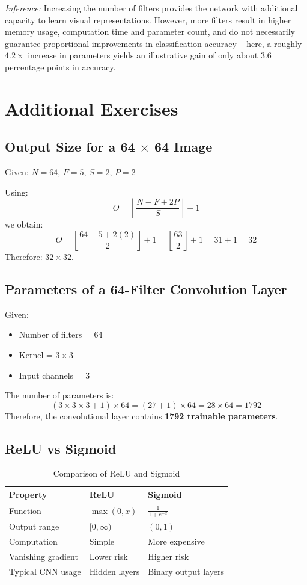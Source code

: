 \documentclass[11pt]{article}
\begin{document}
\textit{Inference:} Increasing the number of filters provides the network with additional capacity to learn visual representations. However, more filters result in higher memory usage, computation time and parameter count, and do not necessarily guarantee proportional improvements in classification accuracy -- here, a roughly $4.2\times$ increase in parameters yields an illustrative gain of only about 3.6 percentage points in accuracy.

\section{Additional Exercises}

\subsection{Output Size for a 64 $\times$ 64 Image}
Given: $N = 64$, $F = 5$, $S = 2$, $P = 2$

Using:
\[
O = \left\lfloor \frac{N - F + 2P}{S} \right\rfloor + 1
\]
we obtain:
\[
O = \left\lfloor \frac{64 - 5 + 2(2)}{2} \right\rfloor + 1 = \left\lfloor \frac{63}{2} \right\rfloor + 1 = 31 + 1 = 32
\]
Therefore: $32 \times 32$.

\subsection{Parameters of a 64-Filter Convolution Layer}
Given:
\begin{itemize}
    \item Number of filters = 64
    \item Kernel = $3 \times 3$
    \item Input channels = 3
\end{itemize}
The number of parameters is:
\[
(3 \times 3 \times 3 + 1) \times 64 = (27 + 1) \times 64 = 28 \times 64 = 1792
\]
Therefore, the convolutional layer contains \textbf{1792 trainable parameters}.

\subsection{ReLU vs Sigmoid}
\begin{table}[h]
\centering
\caption{Comparison of ReLU and Sigmoid}
\begin{tabular}{|l|l|l|}
\hline
\textbf{Property} & \textbf{ReLU} & \textbf{Sigmoid} \\
\hline
Function & $\max(0, x)$ & $\frac{1}{1+e^{-x}}$ \\
Output range & $[0, \infty)$ & $(0, 1)$ \\
Computation & Simple & More expensive \\
Vanishing gradient & Lower risk & Higher risk \\
Typical CNN usage & Hidden layers & Binary output layers \\
\hline
\end{tabular}
\end{table}
\end{document}
